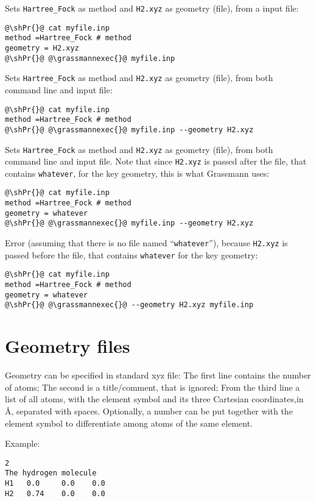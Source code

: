 Sets \verb+Hartree_Fock+ as method and \verb+H2.xyz+ as geometry (file), from a input file:
\begin{lstlisting}[style=shstyint]
@\shPr{}@ cat myfile.inp
method =Hartree_Fock # method
geometry = H2.xyz
@\shPr{}@ @\grassmannexec{}@ myfile.inp
\end{lstlisting}

Sets \verb+Hartree_Fock+ as method and \verb+H2.xyz+ as geometry (file), from both command line and input file:
\begin{lstlisting}[style=shstyint]
@\shPr{}@ cat myfile.inp
method =Hartree_Fock # method
@\shPr{}@ @\grassmannexec{}@ myfile.inp --geometry H2.xyz
\end{lstlisting}

Sets \verb+Hartree_Fock+ as method and \verb+H2.xyz+ as geometry (file),
from both command line and input file.
Note that since \verb+H2.xyz+ is passed after the file, that contains \verb+whatever+,
for the key geometry, this is what Grassmann uses:
\begin{lstlisting}[style=shstyint]
@\shPr{}@ cat myfile.inp
method =Hartree_Fock # method
geometry = whatever
@\shPr{}@ @\grassmannexec{}@ myfile.inp --geometry H2.xyz
\end{lstlisting}

Error (assuming that there is no file named ``\verb+whatever+''),
because \verb+H2.xyz+ is passed before the file, that contains \verb+whatever+ for the key geometry:
\begin{lstlisting}[style=shstyint]
@\shPr{}@ cat myfile.inp
method =Hartree_Fock # method
geometry = whatever
@\shPr{}@ @\grassmannexec{}@ --geometry H2.xyz myfile.inp
\end{lstlisting}


\section{Geometry files}
\label{sec:geometry}
Geometry can be specified in standard xyz file:
The first line contains the number of atoms;
The second is a title/comment, that is ignored;
From the third line a list of all atoms,
with the element symbol and its three Cartesian coordinates,in \AA, separated with spaces.
Optionally, a number can be put together with the element symbol to differentiate
among atoms of the same element.

Example:
\begin{lstlisting}[style=filestyint]
2
The hydrogen molecule
H1   0.0     0.0    0.0
H2   0.74    0.0    0.0
\end{lstlisting}


